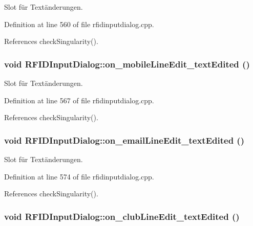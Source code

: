 Slot für Textänderungen. 



Definition at line 560 of file rfidinputdialog.cpp.

References checkSingularity().\hypertarget{class_r_f_i_d_input_dialog_0d12ce25f1a516e1c219400e176c3955}{
\subsubsection[on\_\-mobileLineEdit\_\-textEdited]{\setlength{\rightskip}{0pt plus 5cm}void RFIDInputDialog::on\_\-mobileLineEdit\_\-textEdited ()}}
\label{class_r_f_i_d_input_dialog_0d12ce25f1a516e1c219400e176c3955}


Slot für Textänderungen. 



Definition at line 567 of file rfidinputdialog.cpp.

References checkSingularity().\hypertarget{class_r_f_i_d_input_dialog_e5e5058e55f652dab0d33f9e7ea563ae}{
\subsubsection[on\_\-emailLineEdit\_\-textEdited]{\setlength{\rightskip}{0pt plus 5cm}void RFIDInputDialog::on\_\-emailLineEdit\_\-textEdited ()}}
\label{class_r_f_i_d_input_dialog_e5e5058e55f652dab0d33f9e7ea563ae}


Slot für Textänderungen. 



Definition at line 574 of file rfidinputdialog.cpp.

References checkSingularity().\hypertarget{class_r_f_i_d_input_dialog_833c3a68aeee5cfc0ecdd420e2a13a89}{
\subsubsection[on\_\-clubLineEdit\_\-textEdited]{\setlength{\rightskip}{0pt plus 5cm}void RFIDInputDialog::on\_\-clubLineEdit\_\-textEdited ()}}
\label{class_r_f_i_d_input_dialog_833c3a68aeee5cfc0ecdd420e2a13a89}



